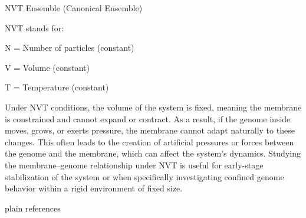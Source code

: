 \documentclass[12pt]{article}
\begin{document}
\begin{flushleft}
\noindent NVT Ensemble (Canonical Ensemble)

NVT stands for:

    N = Number of particles (constant)

    V = Volume (constant)

    T = Temperature (constant)





Under NVT conditions, the volume of the system is fixed, meaning the membrane is constrained and cannot expand or contract. As a result, if the genome inside moves, grows, or exerts pressure, the membrane cannot adapt naturally to these changes. This often leads to the creation of artificial pressures or forces between the genome and the membrane, which can affect the system’s dynamics. Studying the membrane–genome relationship under NVT is useful for early-stage stabilization of the system or when specifically investigating confined genome behavior within a rigid environment of fixed size.


\end{flushleft}

 {plain}  
 {references}  
\end{document}
